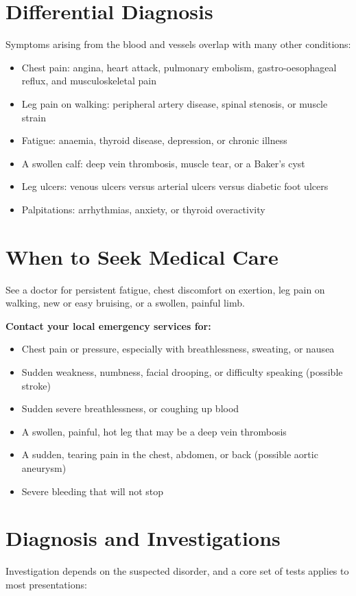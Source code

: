 \section*{Differential Diagnosis}
Symptoms arising from the blood and vessels overlap with many other conditions:

\begin{itemize}
    \item Chest pain: angina, heart attack, pulmonary embolism, gastro-oesophageal reflux, and musculoskeletal pain
    \item Leg pain on walking: peripheral artery disease, spinal stenosis, or muscle strain
    \item Fatigue: anaemia, thyroid disease, depression, or chronic illness
    \item A swollen calf: deep vein thrombosis, muscle tear, or a Baker's cyst
    \item Leg ulcers: venous ulcers versus arterial ulcers versus diabetic foot ulcers
    \item Palpitations: arrhythmias, anxiety, or thyroid overactivity
\end{itemize}

\section*{When to Seek Medical Care}
See a doctor for persistent fatigue, chest discomfort on exertion, leg pain on walking, new or easy bruising, or a swollen, painful limb.

\textbf{Contact your local emergency services for:}
\begin{itemize}
    \item Chest pain or pressure, especially with breathlessness, sweating, or nausea
    \item Sudden weakness, numbness, facial drooping, or difficulty speaking (possible stroke)
    \item Sudden severe breathlessness, or coughing up blood
    \item A swollen, painful, hot leg that may be a deep vein thrombosis
    \item A sudden, tearing pain in the chest, abdomen, or back (possible aortic aneurysm)
    \item Severe bleeding that will not stop
\end{itemize}

\section*{Diagnosis and Investigations}
Investigation depends on the suspected disorder, and a core set of tests applies to most presentations:

